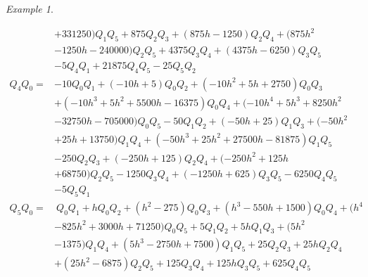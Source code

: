 \documentclass{gtpart}
\theoremstyle{definition}
\theoremstyle{remark}
\newtheorem{ex}[thm]{Example}
\renewcommand{\=}{\approx}
\renewcommand{\-}{\sim}
\numberwithin{equation}{section}
\numberwithin{thm}{section}
\begin{document}
\begin{ex}
\begin{itemize}
\begin{equation*}
\begin{split}
              & +331250) Q_1 Q_5+875 Q_2 Q_3+(875 h-1250) Q_2 Q_4+(875 h^2 \\
              & -1250 h-240000) Q_2 Q_5 +4375 Q_3 Q_4+(4375 h-6250) Q_3 Q_5 \\
              & -5 Q_4 Q_1+21875 Q_4 Q_5-25 Q_5 Q_2 \\
    Q_4 Q_0 = & -10 Q_0 Q_1+(-10 h+5) Q_0 Q_2+(-10 h^2+5 h+2750) Q_0 Q_3 \\
              & +(-10 h^3+5 h^2+5500 h -16375) Q_0 Q_4+(-10 h^4+5 h^3 +8250 h^2 \\
              & -32750 h-705000) Q_0 Q_5-50 Q_1 Q_2 +(-50 h +25) Q_1 Q_3+(-50 h^2 \\
              & +25 h+13750) Q_1 Q_4+(-50 h^3+25 h^2 +27500 h -81875) Q_1 Q_5 \\
              & -250 Q_2 Q_3+(-250 h + 125) Q_2 Q_4 +(-250 h^2+125 h \\
              & +68750) Q_2 Q_5 -1250 Q_3 Q_4 +(-1250 h +625) Q_3 Q_5-6250 Q_4 Q_5 \\
              & -5 Q_5 Q_1 \\
    Q_5 Q_0 = & ~ Q_0 Q_1+h Q_0 Q_2+(h^2-275) Q_0 Q_3+(h^3-550 h+1500) Q_0 Q_4 +(h^4 \\
              & -825 h^2+3000 h +71250) Q_0 Q_5+5 Q_1 Q_2+5 h Q_1 Q_3 +(5 h^2 \\
              & -1375) Q_1 Q_4 +(5 h^3-2750 h+7500) Q_1 Q_5 +25 Q_2 Q_3 +25 h Q_2 Q_4\\
              & +(25 h^2-6875) Q_2 Q_5+125 Q_3 Q_4+125 h Q_3 Q_5 +625 Q_4 Q_5 
   \end{split}
  \end{equation*}


\end{itemize}
\end{ex}
\end{document}
